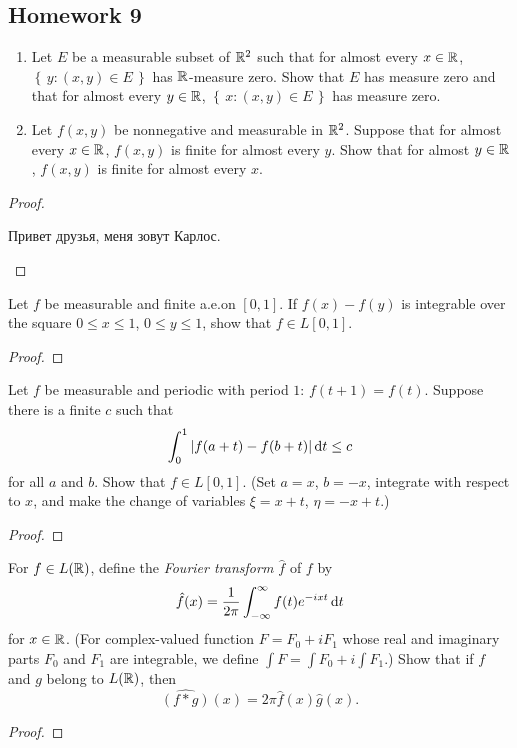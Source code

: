 \subsection{Homework 9}
\begin{problem}
\begin{enumerate}[label=(\alph*),noitemsep]
\item Let $E$ be a measurable subset of $\mathbb{R}^2$ such that for almost every
  $x\in\mathbb{R}$, $\left\{\,y:(x,y)\in E\,\right\}$ has
  $\mathbb{R}$-measure zero. Show that $E$ has measure zero and that for almost
  every $y\in\mathbb{R}$, $\left\{\,x:(x,y)\in E\,\right\}$ has
  measure zero.
\item Let $f(x,y)$ be nonnegative and measurable in $\mathbb{R}^2$. Suppose that
  for almost every $x\in\mathbb{R}$, $f(x,y)$ is finite for almost every
  $y$. Show that for almost $y\in\mathbb{R}$, $f(x,y)$ is finite for almost
  every $x$.
\end{enumerate}
\end{problem}
\begin{proof}
\begin{russian}
Привет друзья, меня зовут Карлос.
\end{russian}
\end{proof}

\begin{problem}
Let $f$ be measurable and finite a.e.\@ on $[0,1]$. If $f(x)-f(y)$ is
integrable over the square $0\leq x\leq 1$, $0\leq y\leq 1$, show that
$f\in L[0,1]$.
\end{problem}
\begin{proof}
\end{proof}

\begin{problem}
Let $f$ be measurable and periodic with period $1$: $f(t+1)=f(t)$. Suppose
there is a finite $c$ such that
\[
\int_0^1|f(a+t)-f(b+t)|\mathop{}\!\mathrm{d} t\leq c
\]
for all $a$ and $b$. Show that $f\in L[0,1]$. (Set $a=x$, $b=-x$, integrate
with respect to $x$, and make the change of variables $\xi=x+t$,
$\eta=-x+t$.)
\end{problem}
\begin{proof}
\end{proof}

\begin{problem}
For $f\in L(\mathbb{R})$, define the \emph{Fourier transform $\hat f$} of $f$
by
\[
\hat f(x)=\frac{1}{2\pi}\int_{-\infty}^\infty f(t)e^{-ixt}\mathop{}\!\mathrm{d} t
\]
for $x\in\mathbb{R}$. (For complex-valued function $F=F_0+iF_1$ whose real and
imaginary parts $F_0$ and $F_1$ are integrable, we define $\int F=\int
F_0+i\int F_1$.) Show that if $f$ and $g$ belong to $L(\mathbb{R})$, then
\[
\widehat{(f*g)}(x)=2\pi\hat f(x)\hat g(x).
\]
\end{problem}
\begin{proof}
\end{proof}

